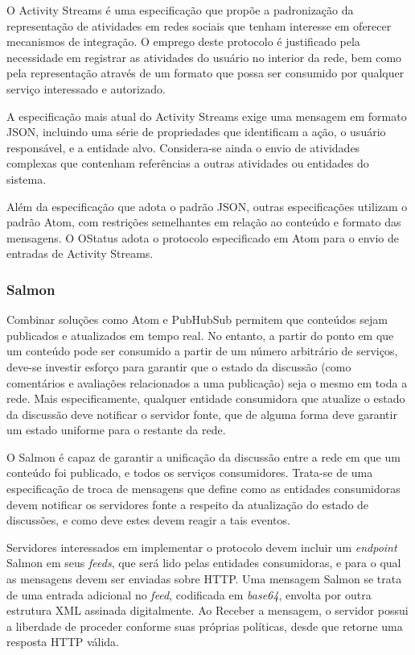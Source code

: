 
O Activity Streams é uma especificação que propõe a padronização da representação de
atividades em redes sociais que tenham interesse em oferecer mecanismos de
integração. O emprego deste protocolo é justificado pela necessidade em registrar as
atividades do usuário no interior da rede, bem como pela representação através de um
formato que possa ser consumido por qualquer serviço interessado e autorizado.

A especificação mais atual do Activity Streams exige uma mensagem em formato JSON,
incluindo uma série de propriedades que identificam a ação, o usuário responsável, e
a entidade alvo. Considera-se ainda o envio de atividades complexas que contenham
referências a outras atividades ou entidades do sistema. 

Além da especificação que adota o padrão JSON, outras especificações utilizam o
padrão Atom, com restrições semelhantes em relação ao conteúdo e formato das
mensagens. O OStatus adota o protocolo especificado em Atom para o envio de entradas
de Activity Streams.

\subsubsection{Salmon}

Combinar soluções como Atom e PubHubSub permitem que conteúdos sejam publicados e
atualizados em tempo real. No entanto, a partir do ponto em que um conteúdo pode ser
consumido a partir de um número arbitrário de serviços, deve-se investir esforço para
garantir que o estado da discussão (como comentários e avaliações relacionados a uma
publicação) seja o mesmo em toda a rede. Mais especificamente, qualquer entidade
consumidora que atualize o estado da discussão deve notificar o servidor fonte, que
de alguma forma deve garantir um estado uniforme para o restante da rede.

O Salmon é capaz de garantir a unificação da discussão entre a rede em que um
conteúdo foi publicado, e todos os serviços consumidores. Trata-se de uma
especificação de troca de mensagens que define como as entidades consumidoras devem
notificar os servidores fonte a respeito da atualização do estado de discussões, e
como deve estes devem reagir a tais eventos.

Servidores interessados em implementar o protocolo devem incluir um \textit{endpoint}
Salmon em seus \textit{feeds}, que será lido pelas entidades consumidoras, e para o
qual as mensagens devem ser enviadas sobre HTTP. Uma mensagem Salmon se trata de uma
entrada adicional no \textit{feed}, codificada em \textit{base64}, envolta por outra
estrutura XML assinada digitalmente. Ao Receber a mensagem, o servidor possui a
liberdade de proceder conforme suas próprias políticas, desde que retorne uma
resposta HTTP válida.

